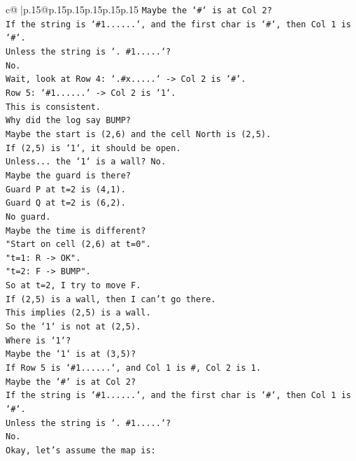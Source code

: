 \documentclass{article}
\begin{document}
{\begin{supertabular}{c@{$\;$}|p{.15\linewidth}@{}p{.15\linewidth}p{.15\linewidth}p{.15\linewidth}p{.15\linewidth}p{.15\linewidth}}
{{{\texttt{Maybe the `\#` is at Col 2?} \\
\texttt{If the string is `\#1......`, and the first char is `\#`, then Col 1 is `\#`.} \\
\texttt{Unless the string is `. \#1.....`?} \\
\texttt{No.} \\
\texttt{Wait, look at Row 4: `.\#x.....` {-}> Col 2 is `\#`.} \\
\texttt{Row 5: `\#1......` {-}> Col 2 is `1`.} \\
\texttt{This is consistent.} \\
\texttt{Why did the log say BUMP?} \\
\texttt{Maybe the start is (2,6) and the cell North is (2,5).} \\
\texttt{If (2,5) is `1`, it should be open.} \\
\texttt{Unless... the `1` is a wall? No.} \\
\texttt{Maybe the guard is there?} \\
\texttt{Guard P at t=2 is (4,1).} \\
\texttt{Guard Q at t=2 is (6,2).} \\
\texttt{No guard.} \\
\texttt{Maybe the time is different?} \\
\texttt{"Start on cell (2,6) at t=0".} \\
\texttt{"t=1: R {-}> OK".} \\
\texttt{"t=2: F {-}> BUMP".} \\
\texttt{So at t=2, I try to move F.} \\
\texttt{If (2,5) is a wall, then I can't go there.} \\
\texttt{This implies (2,5) is a wall.} \\
\texttt{So the `1` is not at (2,5).} \\
\texttt{Where is `1`?} \\
\texttt{Maybe the `1` is at (3,5)?} \\
\texttt{If Row 5 is `\#1......`, and Col 1 is \#, Col 2 is 1.} \\
\texttt{Maybe the `\#` is at Col 2?} \\
\texttt{If the string is `\#1......`, and the first char is `\#`, then Col 1 is `\#`.} \\
\texttt{Unless the string is `. \#1.....`?} \\
\texttt{No.} \\
\texttt{Okay, let's assume the map is:} \\
}}}
\end{supertabular}}
\end{document}
